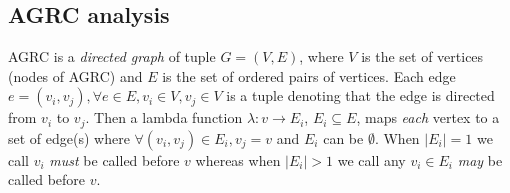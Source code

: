 \subsection{AGRC analysis}
\label{sec:agrc-analysis}



AGRC is a \textit{directed graph} of tuple $G =(V,E)$, where $V$ is the
set of vertices (nodes of AGRC) and $E$ is the set of ordered pairs of
vertices. Each edge $e = (v_i,v_j), \forall e \in E, v_i \in V, v_j \in
V$ is a tuple denoting that the edge is directed from $v_i$ to $v_j$.
Then a lambda  function $\lambda:v \rightarrow E_i$, $E_i \subseteq E$,
maps \textit{each} vertex to a set of edge(s) where $\forall (v_i,v_j)
\in E_i, v_j = v$ and $E_i$ can be $\emptyset$. When $|E_i| = 1$ we call
$v_i$ \textit{must} be called before $v$ whereas when $|E_i| > 1$ we
call any $v_i \in E_i$ \textit{may} be called before $v$.

